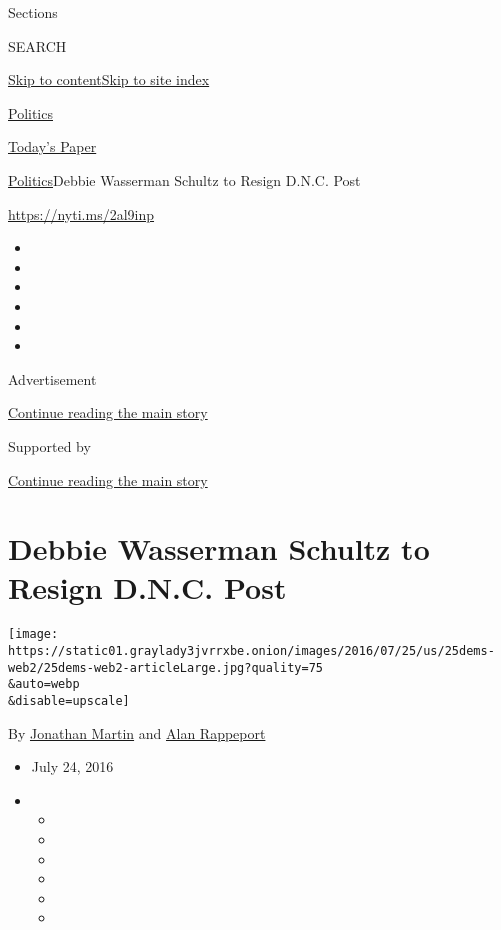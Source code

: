 Sections

SEARCH

\protect\hyperlink{site-content}{Skip to
content}\protect\hyperlink{site-index}{Skip to site index}

\href{https://www.nytimes3xbfgragh.onion/section/politics}{Politics}

\href{https://myaccount.nytimes3xbfgragh.onion/auth/login?response_type=cookie\&client_id=vi}{}

\href{https://www.nytimes3xbfgragh.onion/section/todayspaper}{Today's
Paper}

\href{/section/politics}{Politics}\textbar{}Debbie Wasserman Schultz to
Resign D.N.C. Post

\url{https://nyti.ms/2al9inp}

\begin{itemize}
\item
\item
\item
\item
\item
\item
\end{itemize}

Advertisement

\protect\hyperlink{after-top}{Continue reading the main story}

Supported by

\protect\hyperlink{after-sponsor}{Continue reading the main story}

\hypertarget{debbie-wasserman-schultz-to-resign-dnc-post}{%
\section{Debbie Wasserman Schultz to Resign D.N.C.
Post}\label{debbie-wasserman-schultz-to-resign-dnc-post}}

\texttt{[image: https://static01.graylady3jvrrxbe.onion/images/2016/07/25/us/25dems-web2/25dems-web2-articleLarge.jpg?quality=75\\\&auto=webp\\\&disable=upscale]}

By \href{http://www.nytimes3xbfgragh.onion/by/jonathan-martin}{Jonathan
Martin} and
\href{https://www.nytimes3xbfgragh.onion/by/alan-rappeport}{Alan
Rappeport}

\begin{itemize}
\item
  July 24, 2016
\item
  \begin{itemize}
  \item
  \item
  \item
  \item
  \item
  \item
  \end{itemize}
\end{itemize}


